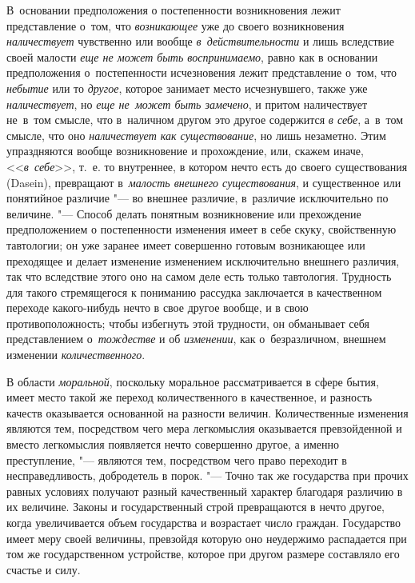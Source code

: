 В~основании предположения о постепенности возникновения лежит представление
о~том, что {\em возникающее} уже до своего возникновения {\em наличествует}
чувственно или вообще {\em в~действительности} и лишь вследствие своей малости
{\em еще не может быть воспринимаемо}, равно как в основании предположения
о~постепенности исчезновения лежит представление о~том, что {\em небытие} или
то {\em другое}, которое занимает место исчезнувшего, также уже
{\em наличествует}, но {\em еще не~может быть замечено}, и притом наличествует
не~в~том смысле, что в~наличном другом это другое содержится {\em в себе},
а~в~том смысле, что оно {\em наличествует как существование}, но лишь
незаметно. Этим упраздняются вообще возникновение и прохождение, или, скажем
иначе, <<{\em в~себе}>>, т.~е. то внутреннее, в котором нечто есть до своего
существования (Dasein), превращают в~{\em малость внешнего существования}, и
существенное или понятийное различие "--- во внешнее различие, в~различие
исключительно по величине. "--- Способ делать понятным возникновение или
прехождение предположением о постепенности изменения имеет в себе скуку,
свойственную тавтологии; он уже заранее имеет совершенно готовым возникающее
или преходящее и делает изменение изменением исключительно внешнего различия,
так что вследствие этого оно на самом деле есть только тавтология. Трудность
для такого стремящегося к пониманию рассудка заключается в качественном
переходе какого-нибудь нечто в свое другое вообще, и в свою противоположность;
чтобы избегнуть этой трудности, он обманывает себя представлением
о~{\em тождестве} и об {\em изменении}, как о~безразличном,
внешнем изменении {\em количественного}.

В области {\em моральной}, поскольку моральное рассматривается в сфере бытия,
имеет место такой же переход количественного в качественное, и разность качеств
оказывается основанной на разности величин. Количественные изменения являются
тем, посредством чего мера легкомыслия оказывается превзойденной и вместо
легкомыслия появляется нечто совершенно другое, а именно преступление, "---
являются тем, посредством чего право переходит в несправедливость, добродетель
в порок. "--- Точно так же государства при прочих равных условиях получают
разный качественный характер благодаря различию в их величине. Законы и
государственный строй превращаются в нечто другое, когда увеличивается объем
государства и возрастает число граждан. Государство имеет меру своей величины,
превзойдя которую оно неудержимо распадается при том же государственном
устройстве, которое при другом размере составляло его счастье и силу.

